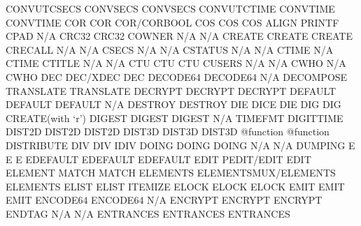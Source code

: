 \documentclass[letterpaper,10pt,english]{sphinxmanual}
\begin{document}
\begin{description}
CONVUTCSECS             CONVSECS                     CONVSECS
CONVUTCTIME             CONVTIME                     CONVTIME
COR                     COR                          COR/CORBOOL
COS                     COS                          COS
ALIGN                   PRINTF                       CPAD
N/A                     CRC32                        CRC32
COWNER                  N/A                          N/A
CREATE                  CREATE                       CREATE
CRECALL                 N/A                          N/A
CSECS                   N/A                          N/A
CSTATUS                 N/A                          N/A
CTIME                   N/A                          CTIME
CTITLE                  N/A                          N/A
CTU                     CTU                          CTU
CUSERS                  N/A                          N/A
CWHO                    N/A                          CWHO
DEC                     DEC/XDEC                     DEC
DECODE64                DECODE64                     N/A
DECOMPOSE               TRANSLATE                    TRANSLATE
DECRYPT                 DECRYPT                      DECRYPT
DEFAULT                 DEFAULT                      DEFAULT
N/A                     DESTROY                      DESTROY
DIE                     DICE                         DIE
DIG                     DIG                          CREATE(with ‘r’)
DIGEST                  DIGEST                       DIGEST
N/A                     TIMEFMT                      DIGITTIME
DIST2D                  DIST2D                       DIST2D
DIST3D                  DIST3D                       DIST3D
@function               @function                    DISTRIBUTE
DIV                     DIV                          IDIV
DOING                   DOING                        DOING
N/A                     N/A                          DUMPING
E                       E                            E
EDEFAULT                EDEFAULT                     EDEFAULT
EDIT                    PEDIT/EDIT                   EDIT
ELEMENT                 MATCH                        MATCH
ELEMENTS                ELEMENTSMUX/ELEMENTS         ELEMENTS
ELIST                   ELIST                        ITEMIZE
ELOCK                   ELOCK                        ELOCK
EMIT                    EMIT                         EMIT
ENCODE64                ENCODE64                     N/A
ENCRYPT                 ENCRYPT                      ENCRYPT
ENDTAG                  N/A                          N/A
ENTRANCES               ENTRANCES                    ENTRANCES

\end{description}
\end{document}
